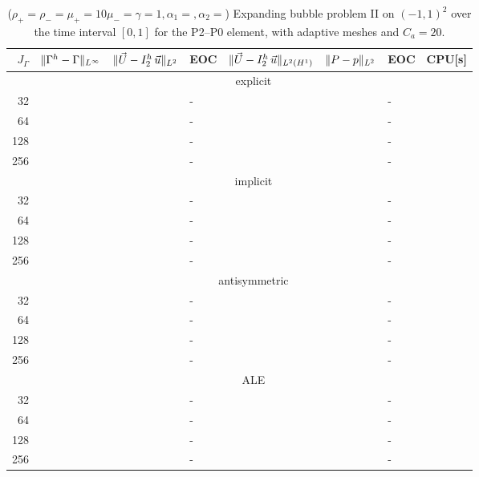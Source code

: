 \begin{table}
\center
\hspace*{-3.25cm}
\begin{tabular}{rllllllr}
\hline
$J_\Gamma$ & $\|\Gamma^h - \Gamma\|_{L^\infty}$ & $\|\vec U - I^h_{2}\,\vec u\|_{L^2}$ & EOC & $\|\vec U - I^h_{2}\,\vec u\|_{L^2(H^1)}$ & $\|P - p\|_{L^2}$ & EOC
& CPU[s] \\
\hline
& \multicolumn{7}{c}{explicit} \\
\hline
 32 & & & - & & & - & \\
 64 & & & - & & & - & \\
128 & & & - & & & - & \\
256 & & & - & & & - & \\
\hline
& \multicolumn{7}{c}{implicit} \\
\hline
 32 & & & - & & & - & \\
 64 & & & - & & & - & \\
128 & & & - & & & - & \\
256 & & & - & & & - & \\
\hline
& \multicolumn{7}{c}{antisymmetric} \\
\hline
 32 & & & - & & & - & \\
 64 & & & - & & & - & \\
128 & & & - & & & - & \\
256 & & & - & & & - & \\
\hline
& \multicolumn{7}{c}{ALE} \\
\hline
 32 & & & - & & & - & \\
 64 & & & - & & & - & \\
128 & & & - & & & - & \\
256 & & & - & & & - & \\
\hline
\end{tabular}
\hspace*{-3.25cm}
\caption[Navier--Stokes expanding bubble II errors P2--P0]
{($\rho_+ = \rho_- = \mu_+ = 10\mu_- = \gamma = 1,\alpha_1=,\alpha_2=$)
Expanding bubble problem II on $(-1,1)^2$ over the time interval $[0,1]$ for
the P2--P0 element, with adaptive meshes and $C_a=20$\textdegree.}
\label{tab:nsexpandingbubbleIIp2p0}
\end{table}

